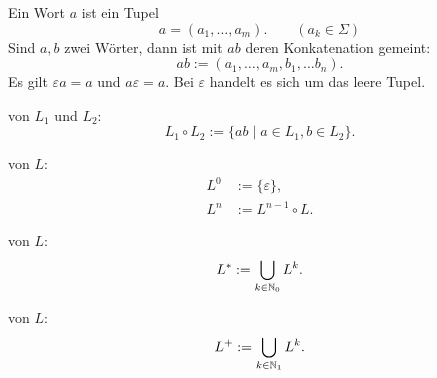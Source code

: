 Ein Wort $a$ ist ein Tupel
\begin{equation}
a = (a_1,\ldots, a_m).\qquad (a_k\in\Sigma)
\end{equation}
Sind $a,b$ zwei Wörter, dann ist mit $ab$ deren Konkatenation
gemeint:
\begin{equation}
ab := (a_1,\ldots,a_m,b_1,\ldots b_n).
\end{equation}
Es gilt $\varepsilon a=a$ und $a\varepsilon=a$.
Bei $\varepsilon$ handelt es sich um das leere Tupel.

\begin{definition}
 von $L_1$ und $L_2$:
\begin{equation}
L_1\circ L_2 := \{ab\mid a\in L_1, b\in L_2\}.
\end{equation}
\end{definition}

\begin{definition}
 von $L$:
\begin{align}
L^0 &:= \{\varepsilon\},\\
L^n &:= L^{n-1}\circ L.
\end{align}
\end{definition}

\begin{definition}
 von $L$:
\begin{equation}
L^* := \bigcup_{k\in\mathbb N_0} L^k.
\end{equation}

 von $L$:
\begin{equation}
L^+ := \bigcup_{k\in\mathbb N_1} L^k.
\end{equation}
\end{definition}

